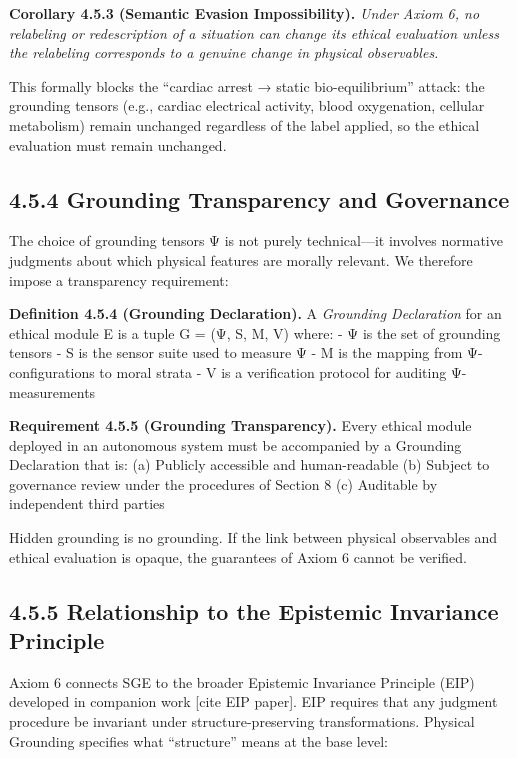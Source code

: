 \documentclass[12pt]{article}
\theoremstyle{plain}
\theoremstyle{definition}
\theoremstyle{remark}
\begin{document}
\textbf{Corollary 4.5.3 (Semantic Evasion Impossibility).} \emph{Under
Axiom 6, no relabeling or redescription of a situation can change its
ethical evaluation unless the relabeling corresponds to a genuine change
in physical observables.}

This formally blocks the ``cardiac arrest → static bio-equilibrium''
attack: the grounding tensors (e.g., cardiac electrical activity, blood
oxygenation, cellular metabolism) remain unchanged regardless of the
label applied, so the ethical evaluation must remain unchanged.

\subsection{4.5.4 Grounding Transparency and
Governance}\label{grounding-transparency-and-governance}

The choice of grounding tensors Ψ is not purely technical---it involves
normative judgments about which physical features are morally relevant.
We therefore impose a transparency requirement:

\textbf{Definition 4.5.4 (Grounding Declaration).} A \emph{Grounding
Declaration} for an ethical module E is a tuple G = (Ψ, S, M, V) where:
- Ψ is the set of grounding tensors - S is the sensor suite used to
measure Ψ - M is the mapping from Ψ-configurations to moral strata - V
is a verification protocol for auditing Ψ-measurements

\textbf{Requirement 4.5.5 (Grounding Transparency).} Every ethical
module deployed in an autonomous system must be accompanied by a
Grounding Declaration that is: (a) Publicly accessible and
human-readable (b) Subject to governance review under the procedures of
Section 8 (c) Auditable by independent third parties

Hidden grounding is no grounding. If the link between physical
observables and ethical evaluation is opaque, the guarantees of Axiom 6
cannot be verified.

\subsection{4.5.5 Relationship to the Epistemic Invariance
Principle}\label{relationship-to-the-epistemic-invariance-principle}

Axiom 6 connects SGE to the broader Epistemic Invariance Principle (EIP)
developed in companion work {[}cite EIP paper{]}. EIP requires that any
judgment procedure be invariant under structure-preserving
transformations. Physical Grounding specifies what ``structure'' means
at the base level:
\end{document}
